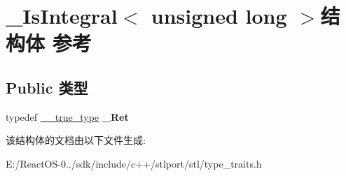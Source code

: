 \hypertarget{struct___is_integral_3_01unsigned_01long_01_4}{}\section{\+\_\+\+Is\+Integral$<$ unsigned long $>$结构体 参考}
\label{struct___is_integral_3_01unsigned_01long_01_4}
\subsection*{Public 类型}
\begin{DoxyCompactItemize}
\item 
\mbox{\label{struct___is_integral_3_01unsigned_01long_01_4_a0fb492e4fed56f840ab2ba3e910f37b8}} 
typedef \hyperlink{struct____true__type}{\+\_\+\+\_\+true\+\_\+type} {\bfseries \+\_\+\+Ret}
\end{DoxyCompactItemize}


该结构体的文档由以下文件生成\+:\begin{DoxyCompactItemize}
\item 
E\+:/\+React\+O\+S-\/0../sdk/include/c++/stlport/stl/type\+\_\+traits.\+h\end{DoxyCompactItemize}

